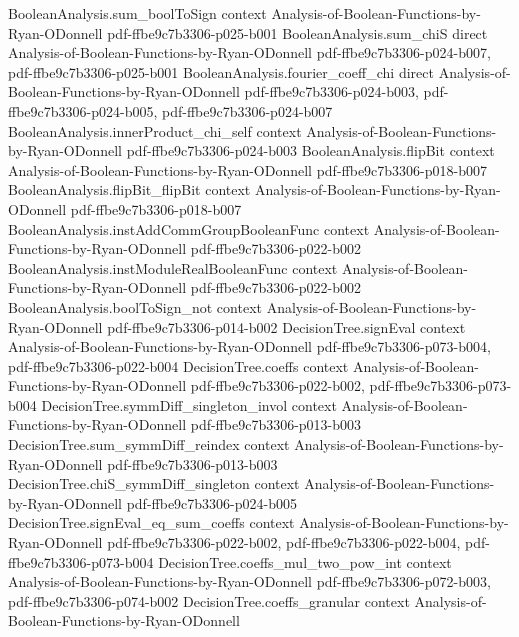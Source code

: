 \begin{theorem}
\proofstep
  {BooleanAnalysis.sum_boolToSign}
  {context}
  {Analysis-of-Boolean-Functions-by-Ryan-ODonnell}
  {pdf-ffbe9c7b3306-p025-b001}
\proofstep
  {BooleanAnalysis.sum_chiS}
  {direct}
  {Analysis-of-Boolean-Functions-by-Ryan-ODonnell}
  {pdf-ffbe9c7b3306-p024-b007,
    pdf-ffbe9c7b3306-p025-b001}
\proofstep
  {BooleanAnalysis.fourier_coeff_chi}
  {direct}
  {Analysis-of-Boolean-Functions-by-Ryan-ODonnell}
  {pdf-ffbe9c7b3306-p024-b003,
    pdf-ffbe9c7b3306-p024-b005,
    pdf-ffbe9c7b3306-p024-b007}
\proofstep
  {BooleanAnalysis.innerProduct_chi_self}
  {context}
  {Analysis-of-Boolean-Functions-by-Ryan-ODonnell}
  {pdf-ffbe9c7b3306-p024-b003}
\proofstep
  {BooleanAnalysis.flipBit}
  {context}
  {Analysis-of-Boolean-Functions-by-Ryan-ODonnell}
  {pdf-ffbe9c7b3306-p018-b007}
\proofstep
  {BooleanAnalysis.flipBit_flipBit}
  {context}
  {Analysis-of-Boolean-Functions-by-Ryan-ODonnell}
  {pdf-ffbe9c7b3306-p018-b007}
\proofstep
  {BooleanAnalysis.instAddCommGroupBooleanFunc}
  {context}
  {Analysis-of-Boolean-Functions-by-Ryan-ODonnell}
  {pdf-ffbe9c7b3306-p022-b002}
\proofstep
  {BooleanAnalysis.instModuleRealBooleanFunc}
  {context}
  {Analysis-of-Boolean-Functions-by-Ryan-ODonnell}
  {pdf-ffbe9c7b3306-p022-b002}
\proofstep
  {BooleanAnalysis.boolToSign_not}
  {context}
  {Analysis-of-Boolean-Functions-by-Ryan-ODonnell}
  {pdf-ffbe9c7b3306-p014-b002}
\proofstep
  {DecisionTree.signEval}
  {context}
  {Analysis-of-Boolean-Functions-by-Ryan-ODonnell}
  {pdf-ffbe9c7b3306-p073-b004,
    pdf-ffbe9c7b3306-p022-b004}
\proofstep
  {DecisionTree.coeffs}
  {context}
  {Analysis-of-Boolean-Functions-by-Ryan-ODonnell}
  {pdf-ffbe9c7b3306-p022-b002,
    pdf-ffbe9c7b3306-p073-b004}
\proofstep
  {DecisionTree.symmDiff_singleton_invol}
  {context}
  {Analysis-of-Boolean-Functions-by-Ryan-ODonnell}
  {pdf-ffbe9c7b3306-p013-b003}
\proofstep
  {DecisionTree.sum_symmDiff_reindex}
  {context}
  {Analysis-of-Boolean-Functions-by-Ryan-ODonnell}
  {pdf-ffbe9c7b3306-p013-b003}
\proofstep
  {DecisionTree.chiS_symmDiff_singleton}
  {context}
  {Analysis-of-Boolean-Functions-by-Ryan-ODonnell}
  {pdf-ffbe9c7b3306-p024-b005}
\proofstep
  {DecisionTree.signEval_eq_sum_coeffs}
  {context}
  {Analysis-of-Boolean-Functions-by-Ryan-ODonnell}
  {pdf-ffbe9c7b3306-p022-b002,
    pdf-ffbe9c7b3306-p022-b004,
    pdf-ffbe9c7b3306-p073-b004}
\proofstep
  {DecisionTree.coeffs_mul_two_pow_int}
  {context}
  {Analysis-of-Boolean-Functions-by-Ryan-ODonnell}
  {pdf-ffbe9c7b3306-p072-b003,
    pdf-ffbe9c7b3306-p074-b002}
\proofstep
  {DecisionTree.coeffs_granular}
  {context}
  {Analysis-of-Boolean-Functions-by-Ryan-ODonnell}

\end{theorem}

